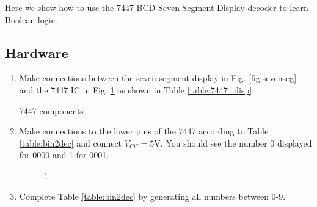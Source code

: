 Here we show how to use the 7447 BCD-Seven Segment Display decoder to learn Boolean logic.
\subsection{Hardware}
\begin{enumerate}[label=\arabic*.,ref=\theenumi]
\item
Make connections between the seven segment display in Fig. \ref{fig:sevenseg} and the  7447 IC in Fig. \ref{fig:7447} as shown in Table \ref{table:7447_disp}

\begin{table}[H]
\centering

\caption{7447 components}
\label{table:components-7447}
\end{table}
%
\begin{table}[H]
\centering

\caption{}
\label{table:7447_disp}
\end{table}
%
\iffalse
\begin{figure}[H]
\begin{center}
\resizebox {0.5\columnwidth} {!} {

}
\end{center}
\caption{}
\label{fig:sevenseg}
\end{figure}
\fi
\item
Make connections to the lower pins of the 7447 according to
Table \ref{table:bin2dec} and connect $V_{CC} = 5$V. You should see the number 0 displayed for 0000 and 1 for 0001.

%
\begin{table}[H]
\centering

\caption{}
\label{table:bin2dec}
\end{table}
%
\begin{figure}[H]
\begin{center}
\resizebox {\columnwidth} {!} {

}
\end{center}
\caption{}
\label{fig:7447}
\end{figure}
%
\item
Complete Table \ref{table:bin2dec} by generating all numbers between 0-9.

	\end{enumerate}

